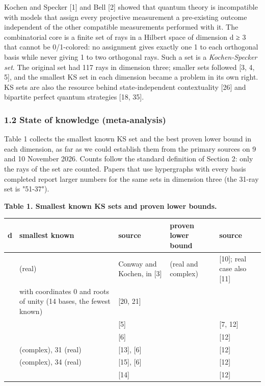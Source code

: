 \documentclass[11pt,a4paper]{article}
\begin{document}
Kochen and Specker {[}1{]} and Bell {[}2{]} showed that quantum theory is incompatible with models that assign
every projective measurement a pre-existing outcome independent of the other compatible measurements
performed with it. The combinatorial core is a finite set of rays in a Hilbert space of dimension d ≥ 3
that cannot be 0/1-colored: no assignment gives exactly one 1 to each orthogonal basis while never
giving 1 to two orthogonal rays. Such a set is a \emph{Kochen-Specker set}. The original set had 117 rays in
dimension three; smaller sets followed {[}3, 4, 5{]}, and the smallest KS set in each dimension became a
problem in its own right. KS sets are also the resource behind state-independent contextuality {[}26{]}
and bipartite perfect quantum strategies {[}18, 35{]}.

\subsubsection{1.2 State of knowledge (meta-analysis)}\label{12-state-of-knowledge-meta-analysis}

Table 1 collects the smallest known KS set and the best proven lower bound in each dimension, as far as
we could establish them from the primary sources on 9 and 10 November 2026. Counts follow the standard
definition of Section 2: only the rays of the set are counted. Papers that use hypergraphs with every
basis completed report larger numbers for the same sets in dimension three (the 31-ray set is "51-37").

\textbf{Table 1. Smallest known KS sets and proven lower bounds.}

{\def\LTcaptype{none} %
{\small
\begin{longtable}[]{@{}>{\raggedright\arraybackslash}p{}>{\raggedright\arraybackslash}p{}>{\raggedright\arraybackslash}p{}>{\raggedright\arraybackslash}p{}>{\raggedright\arraybackslash}p{}@{}}
\toprule\noalign{}
d & smallest known & source & proven lower bound & source \\
\midrule\noalign{}
\endhead
\bottomrule\noalign{}
\endlastfoot
3 & 31 (real) & Conway and Kochen, in {[}3{]} & 24 (real and complex) & {[}10{]}; real case also {[}11{]} \\
3 & 33 with coordinates 0 and roots of unity (14 bases, the fewest known) & {[}20, 21{]} & & \\
4 & 18 & {[}5{]} & 18 & {[}7, 12{]} \\
5 & 29 & {[}6{]} & 18 & {[}12{]} \\
6 & 21 (complex), 31 (real) & {[}13{]}, {[}6{]} & 18 & {[}12{]} \\
7 & 32 (complex), 34 (real) & {[}15{]}, {[}6{]} & 18 & {[}12{]} \\
8 & 34 & {[}14{]} & 18 & {[}12{]} \\
\end{longtable}
}
}
\end{document}
